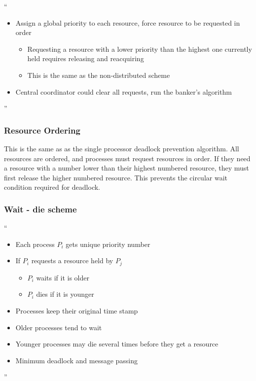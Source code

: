\documentclass[11pt]{article}
\begin{document}
``
\begin{itemize}
\item Assign a global priority to each resource, force resource to be requested in order
\begin{itemize}
\item Requesting a resource with a lower priority than the highest one currently held requires releasing and reacquiring 
\item This is the same as the non-distributed scheme
\end{itemize}
\item Central coordinator could clear all requests, run the banker's algorithm
\end{itemize}
''

\subsubsection {Resource Ordering}
This is the same as as the single processor deadlock prevention algorithm.  All resources are ordered, and processes must request resources in order.  If they need a resource with a number lower than their highest numbered resource, they must first release the higher numbered resource.  This prevents the circular wait condition required for deadlock.

\subsubsection {Wait - die scheme }
``\begin{itemize}
\item Each process $P_i$ gets unique priority number 
\item If $P_i$ requests a resource held by $P_j$ 
\begin{itemize}
\item $P_i$ waits if it is older
\item $P_i$ dies if it is younger
\end{itemize}
\item Processes keep their original time stamp
\item Older processes tend to wait 
\item Younger processes may die several times before they get a resource
\item Minimum deadlock and message passing
\end{itemize} ''
	
\end{document}
